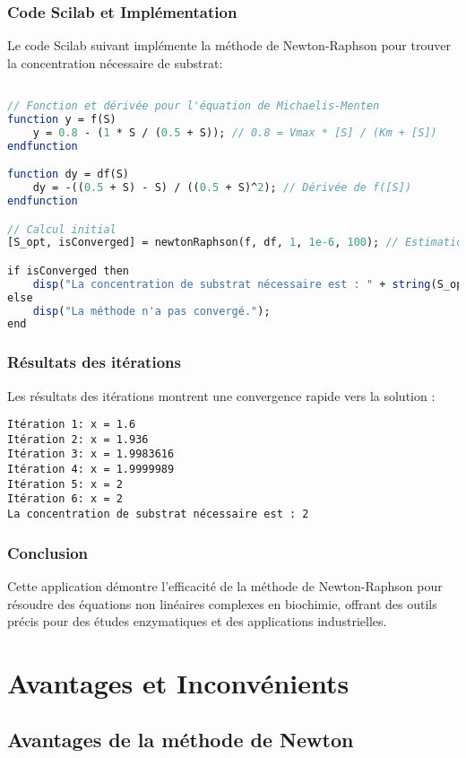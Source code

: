 \documentclass{article}
\begin{document}
\subsubsection{Code Scilab et Implémentation}
Le code Scilab suivant implémente la méthode de Newton-Raphson pour trouver la concentration nécessaire de substrat:

\begin{lstlisting}[language=Scilab]

// Fonction et dérivée pour l'équation de Michaelis-Menten
function y = f(S)
    y = 0.8 - (1 * S / (0.5 + S)); // 0.8 = Vmax * [S] / (Km + [S])
endfunction

function dy = df(S)
    dy = -((0.5 + S) - S) / ((0.5 + S)^2); // Dérivée de f([S])
endfunction

// Calcul initial
[S_opt, isConverged] = newtonRaphson(f, df, 1, 1e-6, 100); // Estimation initiale [S]0 = 1

if isConverged then
    disp("La concentration de substrat nécessaire est : " + string(S_opt));
else
    disp("La méthode n'a pas convergé.");
end
\end{lstlisting}

\subsubsection{Résultats des itérations}
Les résultats des itérations montrent une convergence rapide vers la solution :
\begin{lstlisting}
Itération 1: x = 1.6
Itération 2: x = 1.936
Itération 3: x = 1.9983616
Itération 4: x = 1.9999989
Itération 5: x = 2
Itération 6: x = 2
La concentration de substrat nécessaire est : 2
\end{lstlisting}

\subsubsection{Conclusion}
Cette application démontre l'efficacité de la méthode de Newton-Raphson pour résoudre des équations non linéaires complexes en biochimie, offrant des outils précis pour des études enzymatiques et des applications industrielles.

\section{Avantages et Inconvénients}

\subsection{Avantages de la méthode de Newton}
\end{document}
